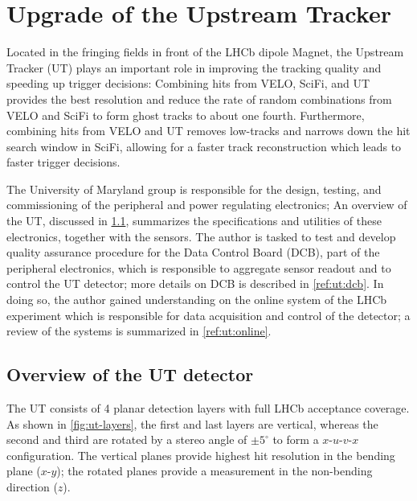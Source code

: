 \chapter{Upgrade of the Upstream Tracker}
\label{ref:ut}

Located in the fringing fields in front of the LHCb dipole Magnet,
the Upstream Tracker (UT) plays an important role in improving the tracking
quality and speeding up trigger decisions:
Combining hits from VELO, SciFi, and UT provides the best \pt resolution
and reduce the rate of random combinations from VELO and SciFi to form
ghost tracks to about one fourth.
Furthermore, combining hits from VELO and UT removes low-\pt tracks and narrows
down the hit search window in SciFi, allowing for a faster track reconstruction
which leads to faster trigger decisions.

The University of Maryland group is responsible for the design, testing, and
commissioning of the peripheral and power regulating electronics;
An overview of the UT, discussed in \cref{ref:ut:overview},
summarizes the specifications and utilities of these electronics,
together with the sensors.
The author is tasked to test and develop quality assurance procedure for
the Data Control Board (DCB),
part of the peripheral electronics,
which is responsible to aggregate sensor readout and to control the UT
detector;
more details on DCB is described in \cref{ref:ut:dcb}.
In doing so, the author gained understanding on the online system of the LHCb
experiment which is responsible for data acquisition and control of the
detector;
a review of the systems is summarized in \cref{ref:ut:online}.


\section{Overview of the UT detector}
\label{ref:ut:overview}

The UT consists of 4 planar detection layers with full LHCb acceptance coverage.
As shown in \cref{fig:ut-layers},
the first and last layers are vertical,
whereas the second and third are rotated by a stereo angle of $\pm 5^\circ$
to form a $x$-$u$-$v$-$x$ configuration.
The vertical planes provide highest hit resolution in the bending plane
($x$-$y$);
the rotated planes provide a measurement in the non-bending direction ($z$).

